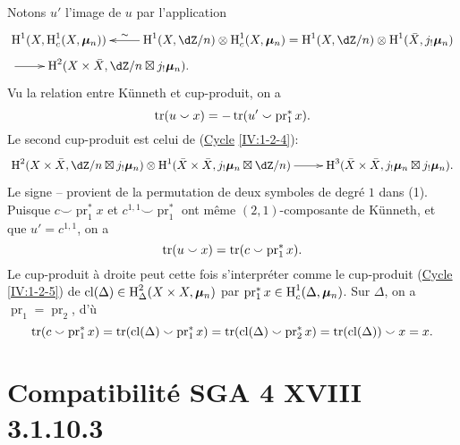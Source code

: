Notons $u'$ l'image de $u$ par l'application 
\begin{align*}
&\xymatrix{
  \h^1(X,\h_c^1(X,\dmu_n)) 
    & \ar[l]_-\sim \h^1(X,\dZ/n) \otimes \h_c^1(X,\dmu_n) = \h^1(X,\dZ/n)\otimes \h^1(\bar X,j_!\dmu_n)
} \\
&\xymatrix{
  \ar[r] 
    & \h^2(X\times \bar X,\dZ/n\boxtimes j_!\dmu_n) \text{.}
}
\end{align*}
Vu la relation entre K\"unneth et cup-produit, on a 
\[
  \operatorname{tr}(u\smallsmile x) = -\operatorname{tr}(u'\smallsmile \operatorname{pr}_1^\ast x) \text{.}
\]
Le second cup-produit est celui de (\hyperref[IV]{Cycle} \ref{IV:1-2-4}):
\[\xymatrix{
  \h^2(X\times \bar X,\dZ/n\boxtimes j_!\dmu_n) \otimes \h^1(\bar X\times \bar X,j_!\dmu_n\boxtimes \dZ/n) \ar[r] 
    & \h^3(\bar X\times \bar X,j_!\dmu_n \boxtimes j_!\dmu_n) \text{.}
}\]
Le signe -- provient de la permutation de deux symboles de degré $1$ dans 
(1). Puisque $c\smallsmile\operatorname{pr}_1^\ast x$ et 
$c^{1,1}\smallsmile \operatorname{pr}_1^\ast$ ont même $(2,1)$-composante de 
K\"unneth, et que $u'=c^{1,1}$, on a 
\[
  \operatorname{tr}(u\smallsmile x) = \operatorname{tr}(c\smallsmile \operatorname{pr}_1^\ast x) \text{.}
\]
Le cup-produit à droite peut cette fois s'interpréter comme le 
cup-produit (\hyperref[IV]{Cycle} \ref{IV:1-2-5}) de 
$\operatorname{cl}(\Delta)\in \operatorname{H}_\Delta^2(X\times X,{\bm\mu}_n)$ par 
$\operatorname{pr}_1^\ast x\in \operatorname{H}_c^1(\Delta,{\bm\mu}_n)$. Sur $\Delta$, on a 
$\operatorname{pr}_1=\operatorname{pr}_2$, d'ù 
\[
  \operatorname{tr}(c\smallsmile \operatorname{pr}_1^\ast x) = \operatorname{tr}(\operatorname{cl}(\Delta)\smallsmile \operatorname{pr}_1^\ast x) = \operatorname{tr}(\operatorname{cl}(\Delta)\smallsmile \operatorname{pr}_2^\ast x) = \operatorname{tr}(\operatorname{cl}(\Delta))\smallsmile x = x \text{.}
\]










\section{Compatibilité SGA 4 XVIII 3.1.10.3}\label{V:4}

